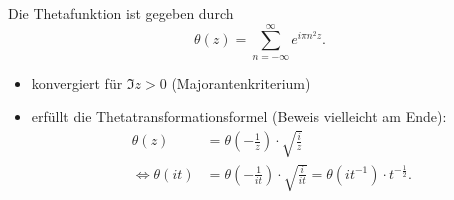 \begin{frame}

    \begin{definition}
        Die Thetafunktion ist gegeben durch
        \[
            \theta(z) = \sum_{n = -\infty}^{\infty} e^{i\pi n^2z}.
        \]
    \end{definition}
    \begin{itemize}
        \item<2-> konvergiert für $\Im z > 0$ (Majorantenkriterium)
        \item<3-> erfüllt die Thetatransformationsformel (Beweis vielleicht am Ende): 
        \begin{align*}
            \theta(z) &= \theta\left(-\frac{1}{z}\right)\cdot \sqrt{\frac{i}{z}}\\
            \Leftrightarrow \theta(it) &= \theta\left(-\frac{1}{it}\right) \cdot \sqrt{\frac{i}{it}} = \theta\left(it^{-1}\right)\cdot t^{-\frac{1}{2}}.
        \end{align*}
    \end{itemize}
\end{frame}
